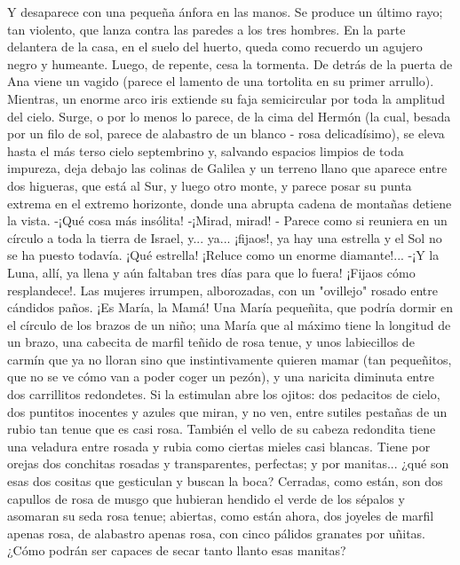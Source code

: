 \documentclass[12pt]{book} %
\begin{document}
Y desaparece con una pequeña ánfora en las manos. 
Se produce un último rayo; tan violento, que lanza contra las paredes a los tres hombres. En la parte delantera de la casa, en el suelo del huerto, queda como recuerdo un agujero negro y humeante. Luego, de repente, cesa la tormenta. De detrás de la puerta de Ana viene un vagido (parece el lamento de una tortolita en su primer arrullo). Mientras, un enorme arco iris extiende su faja semicircular por toda la amplitud del cielo. Surge, o por lo menos lo parece, de la cima del Hermón (la cual, besada por un filo de sol, parece de alabastro de un blanco - rosa delicadísimo), se eleva hasta el más terso cielo septembrino y, salvando espacios limpios de toda impureza, deja debajo las colinas de Galilea y un terreno llano que aparece entre dos higueras, que está al Sur, y luego otro monte, y parece posar su punta extrema en el extremo horizonte, donde una abrupta cadena de montañas detiene la vista. 
-¡Qué cosa más insólita! 
-¡Mirad, mirad! 
- Parece como si reuniera en un círculo a toda la tierra de Israel, y... ya... ¡fijaos!, ya hay una estrella y el Sol no se ha 
puesto todavía. ¡Qué estrella! ¡Reluce como un enorme diamante!... 
-¡Y la Luna, allí, ya llena y aún faltaban tres días para que lo fuera! ¡Fijaos cómo resplandece!. 
Las mujeres irrumpen, alborozadas, con un "ovillejo" rosado entre cándidos paños. 
¡Es María, la Mamá! Una María pequeñita, que podría dormir en el círculo de los brazos de un niño; una María que al 
máximo tiene la longitud de un brazo, una cabecita de marfil teñido de rosa tenue, y unos labiecillos de carmín que ya no lloran sino que instintivamente quieren mamar (tan pequeñitos, que no se ve cómo van a poder coger un pezón), y una naricita diminuta entre dos carrillitos redondetes. Si la estimulan abre los ojitos: dos pedacitos de cielo, dos puntitos inocentes y azules que miran, y no ven, entre sutiles pestañas de un rubio tan tenue que es casi rosa. También el vello de su cabeza redondita tiene una veladura entre rosada y rubia como ciertas mieles casi blancas. 
Tiene por orejas dos conchitas rosadas y transparentes, perfectas; y por manitas... ¿qué son esas dos cositas que gesticulan y buscan la boca? Cerradas, como están, son dos capullos de rosa de musgo que hubieran hendido el verde de los sépalos y asomaran su seda rosa tenue; abiertas, como están ahora, dos joyeles de marfil apenas rosa, de alabastro apenas rosa, con cinco pálidos granates por uñitas. ¿Cómo podrán ser capaces de secar tanto llanto esas manitas? 
\end{document}
